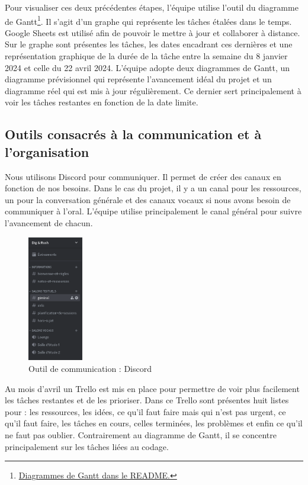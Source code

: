 \documentclass[a4paper,12pt]{article}
\begin{document}
Pour visualiser ces deux précédentes étapes, l’équipe utilise l'outil du diagramme de Gantt\footnote{\href{https://github.com/idlusen/dig-and-rush/}{Diagrammes de Gantt dans le README.}}. 
Il s’agit d’un graphe qui représente les tâches étalées dans le temps. 
Google Sheets est utilisé afin de pouvoir le mettre à jour et collaborer à distance.
Sur le graphe sont présentes les tâches, les dates encadrant ces dernières et une représentation graphique de la durée de la tâche entre la semaine du 8 janvier 2024 et celle du 22 avril 2024.
L’équipe adopte deux diagrammes de Gantt, un diagramme prévisionnel qui représente l’avancement idéal du projet et un diagramme réel qui est mis à jour régulièrement. 
Ce dernier sert principalement à voir les tâches restantes en fonction de la date limite.

\subsection{Outils consacrés à la communication et à l'organisation}
Nous utilisons Discord pour communiquer. 
Il permet de créer des canaux en fonction de nos besoins. 
Dans le cas du projet, il y a un canal pour les ressources, un pour la conversation générale et des canaux vocaux si nous avons besoin de communiquer à l'oral.
L'équipe utilise principalement le canal général pour suivre l’avancement de chacun.

\begin{figure}[h]
	\centering
	\includegraphics[height=5.5cm]{img/discord.png}
	\caption{Outil de communication : Discord}
	\label{discord}
\end{figure}

Au mois d’avril un Trello est mis en place pour permettre de voir plus facilement les tâches restantes et de les prioriser. 
Dans ce Trello sont présentes huit listes pour : les ressources, les idées, ce qu’il faut faire mais qui n’est pas urgent, ce qu’il faut faire, les tâches en cours, celles terminées, les problèmes et enfin ce qu’il ne faut pas oublier. 
Contrairement au diagramme de Gantt, il se concentre principalement sur les tâches liées au codage.
\end{document}

